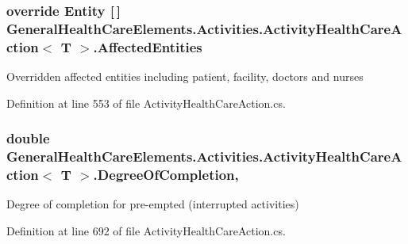 \subsubsection[{\texorpdfstring{Affected\+Entities}{AffectedEntities}}]{\setlength{\rightskip}{0pt plus 5cm}override {\bf Entity} \mbox{[}$\,$\mbox{]} {\bf General\+Health\+Care\+Elements.\+Activities.\+Activity\+Health\+Care\+Action}$<$ T $>$.Affected\+Entities\hspace{0.3cm}{\ttfamily [get]}}\hypertarget{class_general_health_care_elements_1_1_activities_1_1_activity_health_care_action_ac98a7408a03eeff1548ee3a06e5223dd}{}\label{class_general_health_care_elements_1_1_activities_1_1_activity_health_care_action_ac98a7408a03eeff1548ee3a06e5223dd}


Overridden affected entities including patient, facility, doctors and nurses 



Definition at line 553 of file Activity\+Health\+Care\+Action.\+cs.

\subsubsection[{\texorpdfstring{Degree\+Of\+Completion}{DegreeOfCompletion}}]{\setlength{\rightskip}{0pt plus 5cm}double {\bf General\+Health\+Care\+Elements.\+Activities.\+Activity\+Health\+Care\+Action}$<$ T $>$.Degree\+Of\+Completion\hspace{0.3cm}{\ttfamily [get]}, {\ttfamily [set]}}\hypertarget{class_general_health_care_elements_1_1_activities_1_1_activity_health_care_action_a496151671f4f1ba047e68d8096b2a5a5}{}\label{class_general_health_care_elements_1_1_activities_1_1_activity_health_care_action_a496151671f4f1ba047e68d8096b2a5a5}


Degree of completion for pre-\/empted (interrupted activities) 



Definition at line 692 of file Activity\+Health\+Care\+Action.\+cs.

